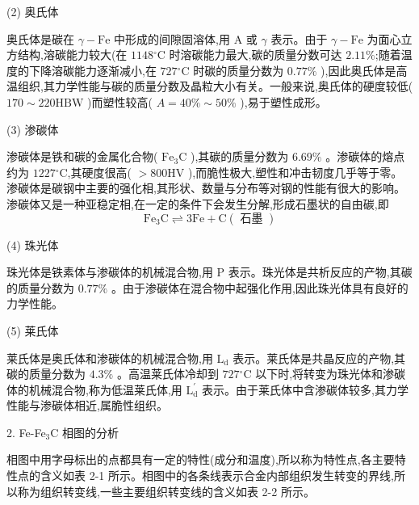 \documentclass[UTF8]{ctexbook}
\newcommand{\◎}{\ensuremath{\bigcirc}}
\begin{document}
(2) 奥氏体

奥氏体是碳在 $\gamma-\mathrm{Fe}$ 中形成的间隙固溶体,用 $\mathrm{A}$ 或 $\gamma$ 表示。由于 $\gamma-\mathrm{Fe}$ 为面心立方结构,溶碳能力较大(在 $1148{ }^{\circ} \mathrm{C}$ 时溶碳能力最大,碳的质量分数可达 $2.11 \%$;随着温度的下降溶碳能力逐渐减小,在 $727{ }^{\circ} \mathrm{C}$ 时碳的质量分数为 $0.77 \%$ ),因此奥氏体是高温组织,其力学性能与碳的质量分数及晶粒大小有关。一般来说,奥氏体的硬度较低( $170 \sim 220 \mathrm{HBW}$ )而塑性较高( $A=40 \% \sim 50 \%$ ),易于塑性成形。

(3) 渗碳体

渗碳体是铁和碳的金属化合物( $\mathrm{Fe}_{3} \mathrm{C}$ ),其碳的质量分数为 $6.69 \%$ 。渗碳体的熔点约为 $1227{ }^{\circ} \mathrm{C}$,其硬度很高( $>800 \mathrm{HV}$ ),而脆性极大,塑性和冲击韧度几乎等于零。渗碳体是碳钢中主要的强化相,其形状、数量与分布等对钢的性能有很大的影响。渗碳体又是一种亚稳定相,在一定的条件下会发生分解,形成石墨状的自由碳,即
\[ \mathrm{Fe}_{3} \mathrm{C} \rightleftharpoons 3 \mathrm{Fe}+\mathrm{C}(\text { 石墨 }) \]

(4) 珠光体

珠光体是铁素体与渗碳体的机械混合物,用 $\mathrm{P}$ 表示。珠光体是共析反应的产物,其碳的质量分数为 $0.77 \%$ 。由于渗碳体在混合物中起强化作用,因此珠光体具有良好的力学性能。

(5) 莱氏体

莱氏体是奥氏体和渗碳体的机械混合物,用 $\mathrm{L}_{\mathrm{d}}$ 表示。莱氏体是共晶反应的产物,其碳的质量分数为 $4.3 \%$ 。高温莱氏体冷却到 $727{ }^{\circ} \mathrm{C}$ 以下时,将转变为珠光体和渗碳体的机械混合物,称为低温莱氏体,用 $\mathrm{L}_{\mathrm{d}}^{\prime}$ 表示。由于莱氏体中含渗碳体较多,其力学性能与渗碳体相近,属脆性组织。

2. Fe-Fe$_3$C 相图的分析

相图中用字母标出的点都具有一定的特性(成分和温度),所以称为特性点,各主要特性点的含义如表 2-1 所示。相图中的各条线表示合金内部组织发生转变的界线,所以称为组织转变线,一些主要组织转变线的含义如表 2-2 所示。
\end{document}

